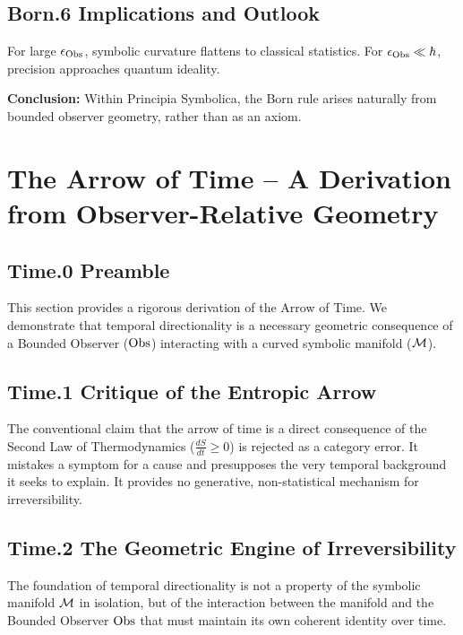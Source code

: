 \subsection{Born.6 Implications and Outlook}
\label{subsec:appC_born_outlook}
For large $\epsilon_{\mathrm{Obs}}$, symbolic curvature flattens to classical statistics.
For $\epsilon_{\mathrm{Obs}} \ll \hbar$, precision approaches quantum ideality.

\medskip

\noindent
\textbf{Conclusion:} Within Principia Symbolica, the Born rule arises naturally
from bounded observer geometry, rather than as an axiom.

\section{The Arrow of Time – A Derivation from Observer-Relative Geometry}
\label{sec:appC_arrow_of_time_rigorous}

\subsection*{Time.0 Preamble}
\label{subsec:appC_time_preamble_rigorous}
This section provides a rigorous derivation of the Arrow of Time. We demonstrate that temporal directionality is a necessary geometric consequence of a Bounded Observer (\(\mathrm{Obs}\)) interacting with a curved symbolic manifold (\(\mathcal{M}\)).

\subsection*{Time.1 Critique of the Entropic Arrow}
\label{subsec:appC_time_critique_rigorous}
The conventional claim that the arrow of time is a direct consequence of the Second Law of Thermodynamics ($\frac{dS}{dt} \geq 0$) is rejected as a category error. It mistakes a symptom for a cause and presupposes the very temporal background it seeks to explain. It provides no generative, non-statistical mechanism for irreversibility.


\subsection*{Time.2 The Geometric Engine of Irreversibility}
\label{subsec:appC_time_geometric_engine_final}
The foundation of temporal directionality is not a property of the symbolic manifold \(\mathcal{M}\) in isolation, but of the interaction between the manifold and the Bounded Observer \(\mathrm{Obs}\) that must maintain its own coherent identity over time.

